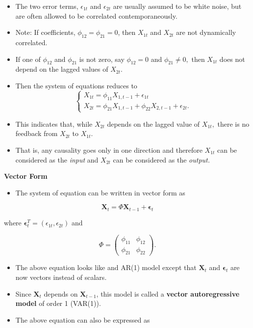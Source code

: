 \documentclass[]{book}
\providecommand{\tightlist}{%
  \setlength{\itemsep}{0pt}\setlength{\parskip}{0pt}}
\begin{document}
\begin{itemize}
\item
  The two error terms, \(\epsilon_{1t}\) and \(\epsilon_{2t}\) are usually assumed to be white noise, but are often allowed to be correlated contemporaneously.
\item
  Note: If coefficients, \(\phi_{12} = \phi_{21}=0\), then \(X_{1t}\) and \(X_{2t}\) are not dynamically correlated.
\item
  If one of \(\phi_{12}\) and \(\phi_{21}\) is not zero, say \(\phi_{12}=0\) and \(\phi_{21}\neq 0,\) then \(X_{1t}\) does not depend on the lagged values of \(X_{2t}\).
\item
  Then the system of equations reduces to
  \[
  \begin{cases}
    X_{1t} = \phi_{11}X_{1,t-1}+\epsilon_{1t}\\
   X_{2t} = \phi_{21}X_{1,t-1}+ \phi_{22}X_{2,t-1}+\epsilon_{2t}.
  \end{cases}
  \]
\item
  This indicates that, while \(X_{2t}\) depends on the lagged value of \(X_{1t},\) there is no feedback from \(X_{2t}\) to \(X_{1t}.\)
\item
  That is, any causality goes only in one direction and therefore \(X_{1t}\) can be considered as the \emph{input} and \(X_{2t}\) can be considered as the \emph{output.}
\end{itemize}

\textbf{Vector Form}

\begin{itemize}
\tightlist
\item
  The system of equation can be written in vector form as
\end{itemize}

\[\mathbf{X}_t=\Phi\mathbf{X}_{t-1}+\symbf{\epsilon}_t\]

where \(\symbf{\epsilon}_t^T=(\epsilon_{1t},\epsilon_{2t})\) and

\[
\Phi=
\begin{pmatrix}
  \phi_{11} &  \phi_{12}\\ 
   \phi_{21} &  \phi_{22}
\end{pmatrix}.
\]

\begin{itemize}
\tightlist
\item
  The above equation looks like and AR(1)
  model except that \(\mathbf{X}_t\) and \(\symbf{\epsilon}_t\) are now vectors instead of scalars.
\item
  Since \(\mathbf{X}_t\) depends on \(\mathbf{X}_{t-1}\), this model is called a \textbf{vector autoregressive model} of order 1 (VAR(1)).
\item
  The above equation can also be expressed as
\end{itemize}
\end{document}
